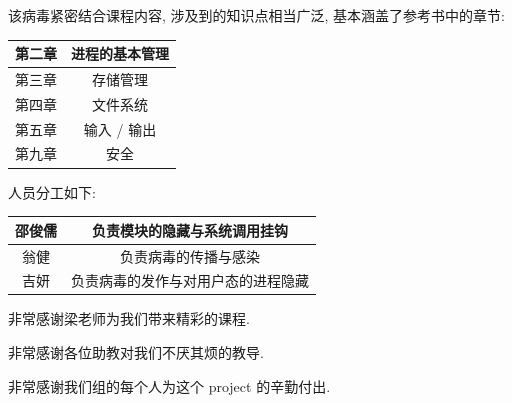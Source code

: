 \documentclass[11pt,fleqn]{book} %
\begin{document}
该病毒紧密结合课程内容, 涉及到的知识点相当广泛, 基本涵盖了参考书中的章节:

\begin{center}
\begin{tabular}{|c|c|}
\hline 
第二章 & 进程的基本管理\tabularnewline
\hline 
第三章 & 存储管理\tabularnewline
\hline 
第四章 & 文件系统\tabularnewline
\hline 
第五章 & 输入 / 输出\tabularnewline
\hline 
第九章 & 安全\tabularnewline
\hline 
\end{tabular}
\par\end{center}



人员分工如下:

\begin{center}
\begin{tabular}{|c|c|}
\hline 
邵俊儒 & 负责模块的隐藏与系统调用挂钩\tabularnewline
\hline 
翁健 & 负责病毒的传播与感染\tabularnewline
\hline 
吉妍 & 负责病毒的发作与对用户态的进程隐藏\tabularnewline
\hline 
\end{tabular}
\par\end{center}

非常感谢梁老师为我们带来精彩的课程.

非常感谢各位助教对我们不厌其烦的教导.

非常感谢我们组的每个人为这个 project 的辛勤付出.
\end{document}
